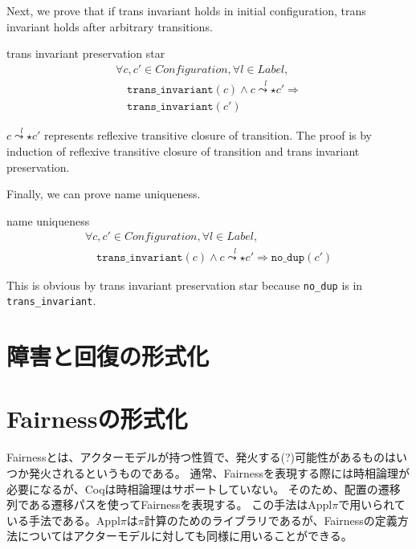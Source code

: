 Next, we prove that if trans invariant holds in initial configuration, trans invariant holds after arbitrary transitions.


\begin{lemma}{trans invariant preservation star}
  \begin{displaymath}
    \begin{array}{l}
      \forall c, c' \in \textit{Configuration}, \forall l \in \textit{Label}, \\
      \quad \texttt{trans\_invariant}(c) \wedge c \overset{l}{\leadsto\star} c' \Rightarrow \\
      \quad \texttt{trans\_invariant}(c')
    \end{array}
  \end{displaymath}
\end{lemma}
$c \overset{l}{\leadsto\star} c'$ represents reflexive transitive closure of transition.
The proof is by induction of reflexive transitive closure of transition and trans invariant preservation.

Finally, we can prove name uniqueness.
\begin{theorem}{name uniqueness}
  \begin{displaymath}
    \begin{array}{l}
      \forall c, c' \in \textit{Configuration}, \forall l \in \textit{Label}, \\
      \quad \texttt{trans\_invariant}(c) \wedge c \overset{l}{\leadsto\star} c' \Rightarrow \texttt{no\_dup}(c')
    \end{array}
  \end{displaymath}
\end{theorem}
This is obvious by trans invariant preservation star because \texttt{no\_dup} is in \texttt{trans\_invariant}.


\section{障害と回復の形式化}

\section{Fairnessの形式化}

Fairnessとは、アクターモデルが持つ性質で、発火する(?)可能性があるものはいつか発火されるというものである。
通常、Fairnessを表現する際には時相論理が必要になるが、Coqは時相論理はサポートしていない。
そのため、配置の遷移列である遷移パスを使ってFairnessを表現する。
この手法はAppl$\pi$\cite{}で用いられている手法である。Appl$\pi$は$\pi$計算のためのライブラリであるが、Fairnessの定義方法についてはアクターモデルに対しても同様に用いることができる。

